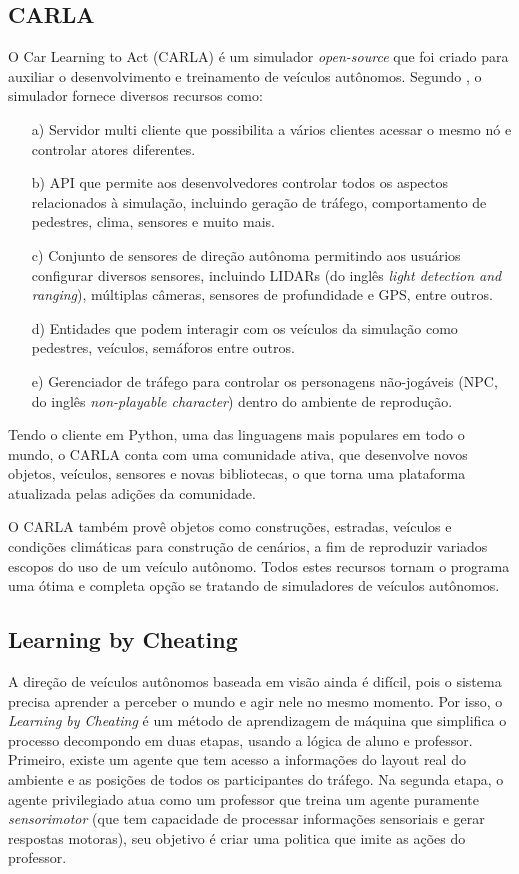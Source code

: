 \documentclass[a4paper,12pt,Times]{article}
\begin{document}
\subsection{CARLA}

O Car Learning to Act (CARLA) é um simulador \textit{open-source} que foi criado para auxiliar o desenvolvimento e treinamento de veículos autônomos. Segundo ,
o simulador fornece diversos recursos como:

\begin{itemize}
    \item[a)] Servidor multi cliente que possibilita a vários clientes acessar o mesmo nó e controlar atores diferentes.
    \item[b)] API que permite aos desenvolvedores controlar todos os aspectos relacionados à simulação, incluindo geração de tráfego, comportamento de pedestres, clima, sensores e muito mais.
    \item[c)] Conjunto de sensores de direção autônoma permitindo aos usuários configurar diversos sensores, incluindo LIDARs (do inglês \textit{light detection and ranging}), múltiplas câmeras, sensores de profundidade e GPS, entre outros.
    \item[d)] Entidades que podem interagir com os veículos da simulação como pedestres, veículos, semáforos entre outros.
    \item[e)] Gerenciador de tráfego para controlar os personagens não-jogáveis (NPC, do inglês \textit{non-playable character}) dentro do ambiente de reprodução.
\end{itemize}

Tendo o cliente em Python, uma das linguagens mais populares em todo o mundo, o CARLA conta com uma comunidade ativa, que desenvolve novos objetos, veículos, sensores e novas bibliotecas, o que torna uma plataforma atualizada pelas adições da comunidade.

O CARLA também provê objetos como construções, estradas, veículos e condições climáticas para construção de cenários, a fim de reproduzir variados escopos do uso de um veículo autônomo. Todos estes recursos tornam o programa uma ótima e completa opção se tratando de simuladores de veículos autônomos.

\subsection{Learning by Cheating}

A direção de veículos autônomos baseada em visão ainda é difícil, pois o sistema precisa aprender a perceber o mundo e agir nele no mesmo momento. Por isso, o \textit{Learning by Cheating} \cite{DBLP:journals/corr/abs-1912-12294} é um método de aprendizagem de máquina que simplifica o processo decompondo em duas etapas, usando a lógica de aluno e professor. Primeiro, existe um agente que tem acesso a informações do layout real do ambiente e as posições de todos os participantes do tráfego. Na segunda etapa, o agente privilegiado atua como um professor que treina um agente puramente \textit{sensorimotor} (que tem capacidade de processar informações sensoriais e gerar respostas motoras), seu objetivo é criar uma politica que imite as ações do professor.
 
\end{document}
